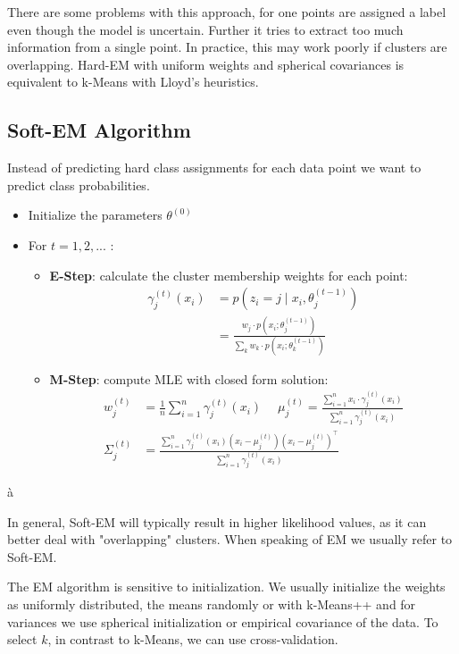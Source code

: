 There are some problems with this approach, for one points are assigned a label even though the model is uncertain. Further it tries to extract too much information from a single point. In practice, this may work poorly if clusters are overlapping. Hard-EM with uniform weights and spherical covariances is equivalent to k-Means with Lloyd's heuristics.

\subsection{Soft-EM Algorithm}

Instead of predicting hard class assignments for each data point we want to predict class probabilities. 
\begin{itemize}
	\item Initialize the parameters $\theta^{(0)}$
	\item For $t = 1,2,...$ :
		\begin{itemize}
			\item \textbf{E-Step}: calculate the cluster membership weights for each point:
				\begin{align*}
					\gamma_j^{(t)}(x_i) &= p(z_i = j \; | \; x_i, \theta_j^{(t-1)}) \\
					&= \frac{w_j \cdot p(x_i ; \theta_j^{(t-1)})}{\sum_k w_k \cdot p(x_i ; \theta_k^{(t-1)})}
				\end{align*}
			\item \textbf{M-Step}: compute MLE with closed form solution:
				\begin{align*}
			 		w_j^{(t)} &= \frac{1}{n} \sum_{i=1}^n \gamma_j^{(t)}(x_i) \quad \; \mu_j^{(t)} = \frac{\sum_{i=1}^n x_i \cdot \gamma_j^{(t)}(x_i)}{\sum_{i=1}^n \gamma_j^{(t)}(x_i)} \\
			 		\Sigma_j^{(t)} &= \frac{\sum_{i=1}^n \gamma_j^{(t)}(x_i)(x_i - \mu_j^{(t)})(x_i - \mu_j^{(t)})^\top}{\sum_{i=1}^n \gamma_j^{(t)}(x_i)}
			 	\end{align*}
		\end{itemize}
\end{itemize}à

In general, Soft-EM will typically result in higher likelihood values, as it can better deal with "overlapping" clusters. When speaking of EM we usually refer to Soft-EM. \smallskip

The EM algorithm is sensitive to initialization. We usually initialize the weights as uniformly distributed, the means randomly or with k-Means++ and for variances we use spherical initialization or empirical covariance of the data. To select $k$, in contrast to k-Means, we can use cross-validation.

